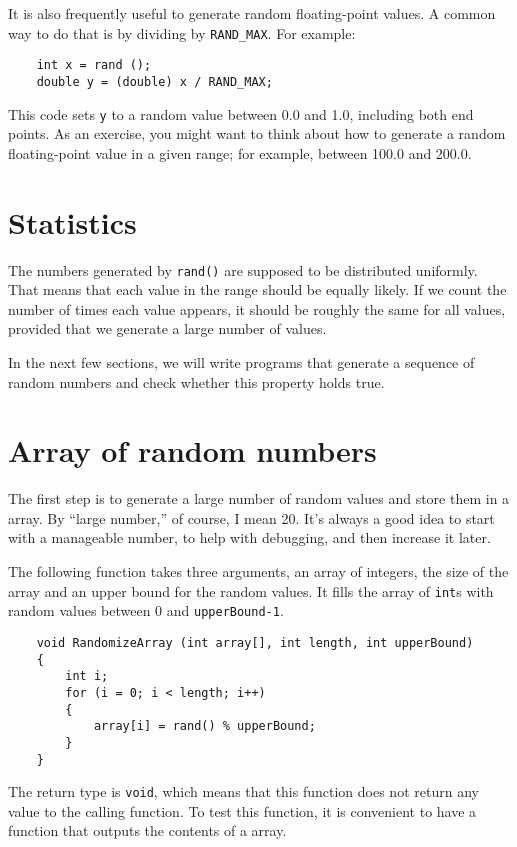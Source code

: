 It is also frequently useful to generate random floating-point values.
A common way to do that is by dividing by {\tt RAND\_MAX}.  For
example:

\begin{verbatim}
    int x = rand ();
    double y = (double) x / RAND_MAX;
\end{verbatim}
%
This code sets {\tt y} to a random value between 0.0 and 1.0,
including both end points.  As an exercise, you might want to
think about how to generate a random floating-point value in
a given range; for example, between 100.0 and 200.0.

\pagebreak
\section{Statistics}

The numbers generated by {\tt rand()} are supposed to be distributed
uniformly.  That means that each value in the range should be
equally likely.  If we count the number of times each value appears,
it should be roughly the same for all values, provided that we
generate a large number of values.

In the next few sections, we will write programs that generate
a sequence of random numbers and check whether this property
holds true.

\section{Array of random numbers}
\label{Array of random numbers}

The first step is to generate a large number of random values
and store them in a array.  By ``large number,'' of course,
I mean 20.  It's always a good idea to start with a manageable
number, to help with debugging, and then increase it later.

The following function takes three arguments, an array of integers, 
the size of the array and an upper bound for the random values.  
It fills the array of {\tt int}s with random values between 0 and {\tt upperBound-1}.

\begin{verbatim}
    void RandomizeArray (int array[], int length, int upperBound) 
    {
        int i;
        for (i = 0; i < length; i++) 
        {
            array[i] = rand() % upperBound;
        }
    }
\end{verbatim}
%
The return type is {\tt void}, which means that
this function does not return any value to the calling function.
To test this function, it is convenient to have a function that
outputs the contents of a array.

